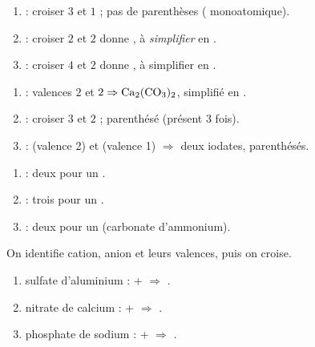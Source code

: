 \documentclass[11pt,a4paper]{article}
\begin{document}
\begin{corrige}
\begin{enumerate}[label=\alph*)]
  \item {} : croiser $3$ et $1$ ; pas de parenthèses ( monoatomique).
  \item {} : croiser $2$ et $2$ donne , à \emph{simplifier} en .
  \item {} : croiser $4$ et $2$ donne , à simplifier en .
\end{enumerate}
\end{corrige}

\begin{corrige}
\begin{enumerate}[label=\alph*)]
  \item {} : valences $2$ et $2 \Rightarrow \ce{Ca2(CO3)2}$, simplifié en .
  \item {} : croiser $3$ et $2$ ;  parenthésé (présent 3 fois).
  \item {} :  (valence 2) et  (valence 1) $\Rightarrow$ deux iodates, parenthésés.
\end{enumerate}
\end{corrige}

\begin{corrige}
\begin{enumerate}[label=\alph*)]
  \item {} : deux  pour un .
  \item {} : trois  pour un .
  \item {} : deux  pour un  (carbonate d'ammonium).
\end{enumerate}
\end{corrige}

\begin{corrige}
On identifie cation, anion et leurs valences, puis on croise.
\begin{enumerate}[label=\alph*)]
  \item sulfate d'aluminium :  +  $\Rightarrow$ .
  \item nitrate de calcium :  +  $\Rightarrow$ .
  \item phosphate de sodium :  +  $\Rightarrow$ .
\end{enumerate}
\end{corrige}
\end{document}
